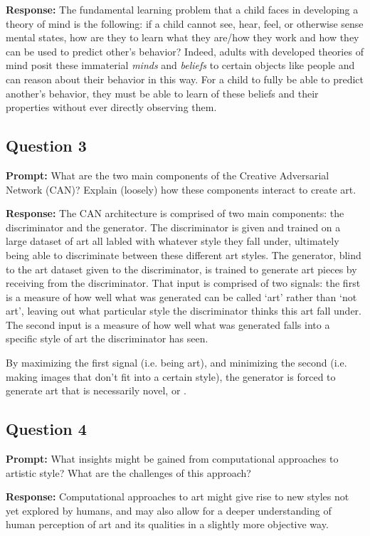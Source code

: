 \documentclass{article}
\begin{document}
\noindent\textbf{Response:} The fundamental learning problem that a child faces in developing a theory of mind is the following: if a child cannot see, hear, feel, or otherwise sense mental states, how are they to learn what they are/how they work and how they can be used to predict other's behavior? Indeed, adults with developed theories of mind posit these immaterial \textit{minds} and \textit{beliefs} to certain objects like people and can reason about their behavior in this way. For a child to fully be able to predict another's behavior, they must be able to learn of these beliefs and their properties without ever directly observing them.

\subsection*{Question 3}
\noindent\textbf{Prompt:} What are the two main components of the Creative Adversarial Network (CAN)? Explain (loosely) how these components interact to create art.
\bigskip

\noindent\textbf{Response:} The CAN architecture is comprised of two main components: the discriminator and the generator. The discriminator is given and trained on a large dataset of art all labled with whatever style they fall under, ultimately being able to discriminate between these different art styles. The generator, blind to the art dataset given to the discriminator, is trained to generate art pieces by receiving from the discriminator. That input is comprised of two signals: the first is a measure of how well what was generated can be called `art' rather than `not art', leaving out what particular style the discriminator thinks this art fall under. The second input is a measure of how well what was generated falls into a specific style of art the discriminator has seen.

By maximizing the first signal (i.e. being art), and minimizing the second (i.e. making images that don't fit into a certain style), the generator is forced to generate art that is necessarily novel, or .

\subsection*{Question 4}
\noindent\textbf{Prompt:} What insights might be gained from computational approaches to artistic style? What are the challenges of this approach?
\bigskip

\noindent\textbf{Response:} Computational approaches to art might give rise to new styles not yet explored by humans, and may also allow for a deeper understanding of human perception of art and its qualities in a slightly more objective way.
\end{document}
